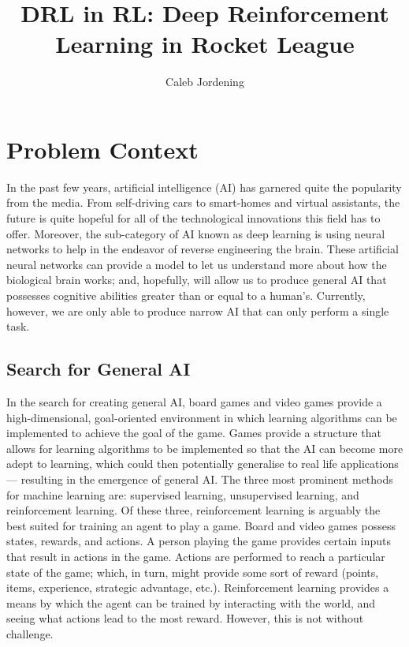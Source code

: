 \documentclass[10pt,twocolumn]{article}
\title{DRL in RL: Deep Reinforcement Learning in Rocket League}
\author{Caleb Jordening}
\affiliation{Occidental College}
\begin{document}
\maketitle

\section {Problem Context}

In the past few years, artificial intelligence (AI) has garnered quite the popularity from the media. From self-driving cars to smart-homes and virtual assistants, the future is quite hopeful for all of the technological innovations this field has to offer. Moreover, the sub-category of AI known as deep learning is using neural networks to help in the endeavor of reverse engineering the brain. These artificial neural networks can provide a model to let us understand more about how the biological brain works; and, hopefully, will allow us to produce general AI that possesses cognitive abilities greater than or equal to a human's. Currently, however, we are only able to produce narrow AI that can only perform a single task. 

\subsection{Search for General AI}
In the search for creating general AI, board games and video games provide a high-dimensional, goal-oriented environment in which learning algorithms can be implemented to achieve the goal of the game. Games provide a structure that allows for learning algorithms to be implemented so that the AI can become more adept to learning, which could then potentially generalise to real life applications — resulting in the emergence of general AI. The three most prominent methods for machine learning are: supervised learning, unsupervised learning, and reinforcement learning. Of these three, reinforcement learning is arguably the best suited for training an agent to play a game. Board and video games possess states, rewards, and actions. A person playing the game provides certain inputs that result in actions in the game. Actions are performed to reach a particular state of the game; which, in turn, might provide some sort of reward (points, items, experience, strategic advantage, etc.). Reinforcement learning provides a means by which the agent can be trained by interacting with the world, and seeing what actions lead to the most reward. However, this is not without challenge.
\end{document}
